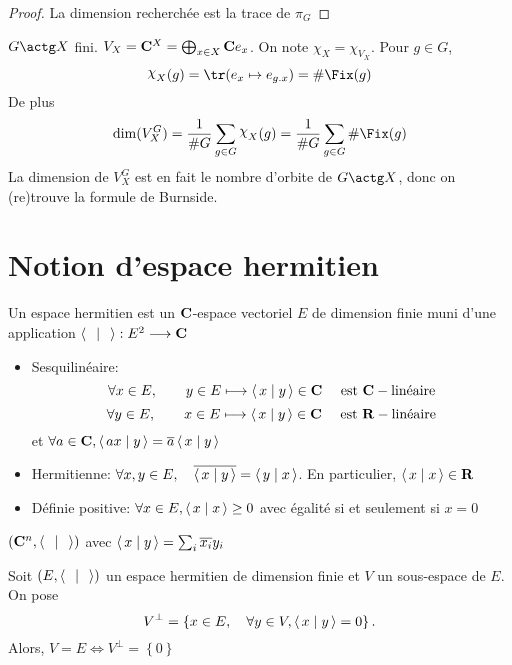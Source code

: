 \begin{proof}
La dimension recherchée est la trace de $\pi_G$
\end{proof}

\begin{ex}
$G\actg X$ fini.  $V_X=\mathbf C^X=\bigoplus_{x \in  X}\mathbf C e_x$. On note $\chi_X=\chi_{V_X}$. Pour $g \in  G$, \[
    \chi_X(g)=\tr(e_x\mapsto e_{g.x})=\# \Fix(g)
\] 
De plus \[
    \dim (V_X^G)=\frac1{\#G}\sum_{g \in  G}\chi_X(g)=\frac1{\#G}\sum_{g \in  G}\#\Fix(g)
\] 
La dimension de $V_X^G$ est en fait le nombre d'orbite de  $G\actg X$, donc on (re)trouve la formule de Burnside.
\end{ex}

\section{Notion d'espace hermitien}

\begin{dfn}
Un espace hermitien est un $ \mathbf C$-espace vectoriel $E$ de dimension finie muni d'une application  $\scalar{\;}{\;} : E^2 \longrightarrow \C$ \begin{itemize}
    \item Sesquilinéaire: \[
            \forall  x \in  E, \qquad  y \in  E \longmapsto \scalar{x}{y} \in  \C \quad \text{ est  }\C-\text{linéaire}
    \] 
    \[
            \forall  y \in  E, \qquad  x \in  E \longmapsto \scalar{x}{y} \in  \C \quad \text{ est  }\R-\text{linéaire}
    \] 
    et $\forall  a \in  \C, \scalar{ax}{y} = \bar{a} \scalar{x}{y} $ 
    \item Hermitienne: $\forall  x, y \in E, \quad  \bar{\scalar{x}{y} }= \scalar{y}{x} $. En particulier, $\scalar{x}{x} \in  \R$
    \item Définie positive: $\forall  x \in  E, \scalar{x}{x} \geq 0$ avec égalité si et seulement si $x=0$
\end{itemize}
\end{dfn}

\begin{ex}
    $(\C^n, \scalar{\;}{\;} )$ avec $\scalar{x}{y} =\sum_i\bar{x_i}y_i$
\end{ex}

\begin{prop}
    Soit $(E, \scalar{\;}{\;} )$ un espace hermitien de dimension finie et $V$ un sous-espace de  $E$. On pose \[V^\bot = \left\{ x \in  E, \quad  \forall  y \in  V, \scalar{x}{y} =0 \right\}. \] Alors, $V=E \iff  V^\bot = \left\{ 0 \right\} $
\end{prop}

